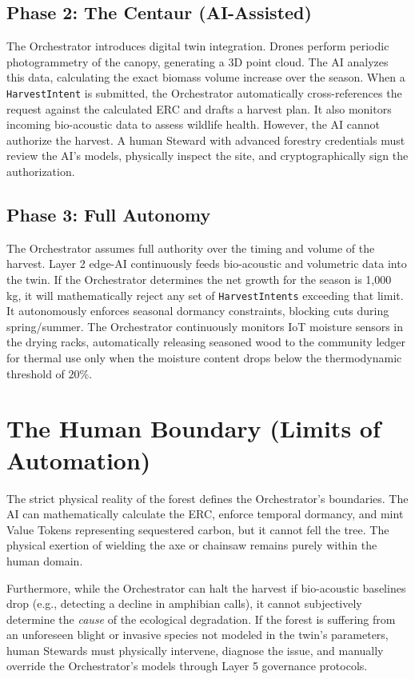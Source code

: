 \subsection{Phase 2: The Centaur (AI-Assisted)}
The Orchestrator introduces digital twin integration. Drones perform periodic photogrammetry of the canopy, generating a 3D point cloud. The AI analyzes this data, calculating the exact biomass volume increase over the season. When a \texttt{HarvestIntent} is submitted, the Orchestrator automatically cross-references the request against the calculated ERC and drafts a harvest plan. It also monitors incoming bio-acoustic data to assess wildlife health. However, the AI cannot authorize the harvest. A human Steward with advanced forestry credentials must review the AI's models, physically inspect the site, and cryptographically sign the authorization.

\subsection{Phase 3: Full Autonomy}
The Orchestrator assumes full authority over the timing and volume of the harvest. Layer 2 edge-AI continuously feeds bio-acoustic and volumetric data into the twin. If the Orchestrator determines the net growth for the season is 1,000 kg, it will mathematically reject any set of \texttt{HarvestIntents} exceeding that limit. It autonomously enforces seasonal dormancy constraints, blocking cuts during spring/summer. The Orchestrator continuously monitors IoT moisture sensors in the drying racks, automatically releasing seasoned wood to the community ledger for thermal use only when the moisture content drops below the thermodynamic threshold of $20\%$.

\section{The Human Boundary (Limits of Automation)}
The strict physical reality of the forest defines the Orchestrator's boundaries. The AI can mathematically calculate the ERC, enforce temporal dormancy, and mint Value Tokens representing sequestered carbon, but it cannot fell the tree. The physical exertion of wielding the axe or chainsaw remains purely within the human domain. 

Furthermore, while the Orchestrator can halt the harvest if bio-acoustic baselines drop (e.g., detecting a decline in amphibian calls), it cannot subjectively determine the \textit{cause} of the ecological degradation. If the forest is suffering from an unforeseen blight or invasive species not modeled in the twin's parameters, human Stewards must physically intervene, diagnose the issue, and manually override the Orchestrator's models through Layer 5 governance protocols.

